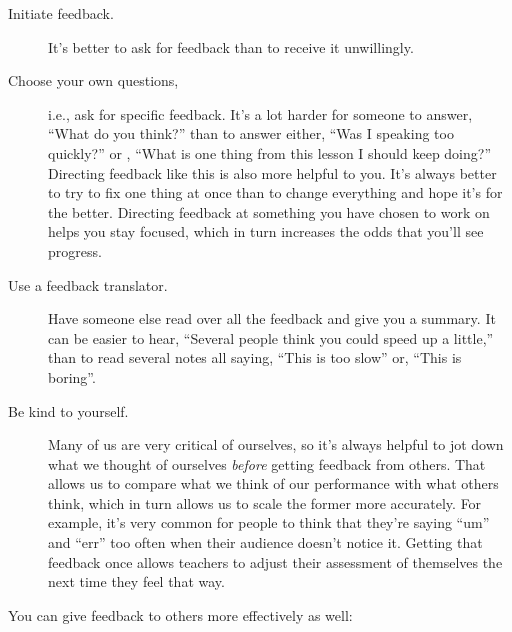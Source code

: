 \begin{description}

\item[Initiate feedback.]
  It's better to ask for feedback than to receive it unwillingly.

\item[Choose your own questions,]
  i.e., ask for specific feedback.
  It's a lot harder for someone to answer,
  ``What do you think?''
  than to answer either,
  ``Was I speaking too quickly?''
  or ,
  ``What is one thing from this lesson I should keep doing?''
  Directing feedback like this is also more helpful to you.
  It's always better to try to fix one thing at once
  than to change everything and hope it's for the better.
  Directing feedback at something you have chosen to work on helps you stay focused,
  which in turn increases the odds that you'll see progress.

\item[Use a feedback translator.]
  Have someone else read over all the feedback and give you a summary.
  It can be easier to hear,
  ``Several people think you could speed up a little,''
  than to read several notes all saying, ``This is too slow''
  or, ``This is boring''.

\item[Be kind to yourself.]
  Many of us are very critical of ourselves,
  so it's always helpful to jot down what we thought of ourselves
  \emph{before} getting feedback from others.
  That allows us to compare what we think of our performance
  with what others think,
  which in turn allows us to scale the former more accurately.
  For example,
  it's very common for people to think that they're saying ``um'' and ``err'' too often
  when their audience doesn't notice it.
  Getting that feedback once allows teachers to adjust their assessment of themselves
  the next time they feel that way.

\end{description}

\noindent
You can give feedback to others more effectively as well:

